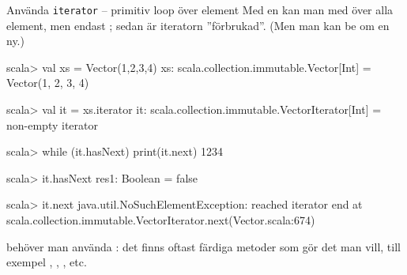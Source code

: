 \begin{Slide}{Använda \texttt{iterator} -- primitiv loop över element}\SlideFontSmall
Med en  kan man  med  över alla element, men endast ; sedan är iteratorn ''förbrukad''. (Men man kan be om en ny.)
\begin{REPL}
scala> val xs = Vector(1,2,3,4)
xs: scala.collection.immutable.Vector[Int] = Vector(1, 2, 3, 4)

scala> val it = xs.iterator
it: scala.collection.immutable.VectorIterator[Int] = non-empty iterator

scala> while (it.hasNext) print(it.next)
1234

scala> it.hasNext
res1: Boolean = false

scala> it.next
java.util.NoSuchElementException: reached iterator end
  at scala.collection.immutable.VectorIterator.next(Vector.scala:674)
\end{REPL}
 behöver man  använda : det finns oftast färdiga metoder som gör det man vill, till exempel , , ,  etc.
\end{Slide}











